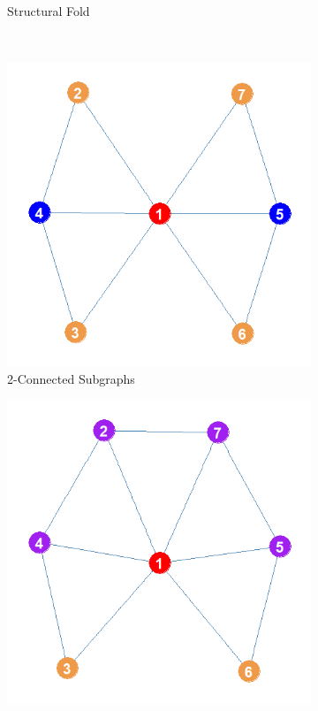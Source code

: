 \documentclass[12pt]{article}
\begin{document}
\begin{figure}
\begin{subfigure}[b]{0.35\textwidth}
            \caption{Structural Fold}
            \label{fig:sf}
    \end{subfigure} \\
    \begin{subfigure}[b]{0.35\textwidth}
        \includegraphics[width=1.0\textwidth]{Plots/Toys/intra.png}
            \caption{2-Connected Subgraphs}
            \label{fig:intra}
    \end{subfigure}
    \begin{subfigure}[b]{0.35\textwidth}
        \includegraphics[width=1.0\textwidth]{Plots/Toys/inter.png}

\end{subfigure}
\end{figure}
\end{document}
